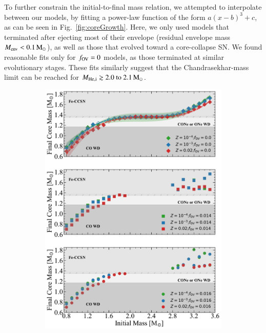 \documentclass[main.tex]{subfiles}
\begin{document}
To further constrain the initial-to-final mass relation, we  attempted to interpolate between our models,  by fitting a power-law function of the form $a(x-b)^3 + c$, as can be seen in 
Fig.~\ref{fig:coreGrowth}. Here, we only used models that terminated after ejecting most of their envelope (residual envelope mass $M_{\rm env} < 0.1\mathrm{\,M_\odot}$), as well as those that evolved toward a core-collapse SN. We found reasonable fits only for  $f_{\rm OV} = 0$ models, as those terminated at similar evolutionary stages. These fits similarly suggest that the Chandrasekhar-mass limit can be reached for $M_{\rm He, i}\gtrsim \numrange{2.0}{2.1}\msun$. 



\begin{figure}[h!]
    \centering
    \begin{subfigure}{.5\textwidth}
        \centering
        \includegraphics[width=0.95\columnwidth]{figures/chapter2/core_growth/series1_coreGrowth_panel1_interpolated.pdf}
    \end{subfigure}%

\end{figure}
\end{document}
